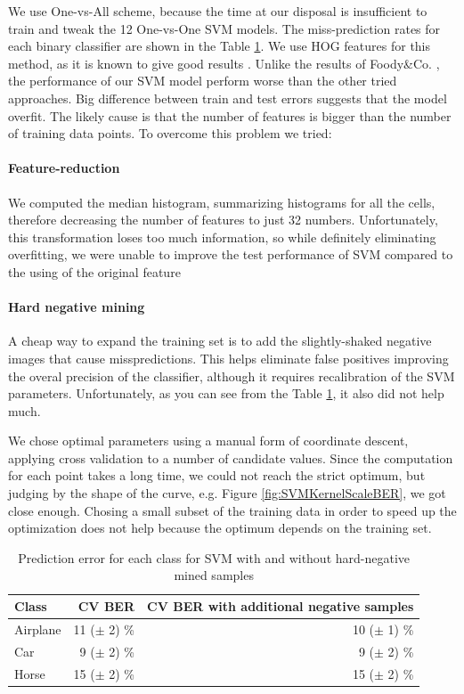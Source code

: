 \documentclass{article} %
\begin{document}
We use One-vs-All scheme, because the time at our disposal is insufficient to train and tweak the 12 One-vs-One SVM models. The miss-prediction rates for each binary classifier are shown in the Table \ref{tbl:SVMerr}. We use HOG features for this method, as it is known to give good results \cite{zhang2010pedestrian}. Unlike the results of Foody\&Co. \cite{foody2004relative}, the performance of our SVM model perform worse than the other tried approaches. Big difference between train and test errors suggests that the model overfit. The likely cause is that the number of features is bigger than the number of training data points. To overcome this problem we tried:

\paragraph{Feature-reduction} We computed the median histogram, summarizing histograms for all the cells, therefore decreasing the number of features to just 32 numbers. Unfortunately, this transformation loses too much information, so while definitely eliminating overfitting, we were unable to improve the test performance of SVM compared to the using of the original feature

\paragraph{Hard negative mining} A cheap way to expand the training set is to add the slightly-shaked negative images that cause misspredictions. This helps eliminate false positives improving the overal precision of the classifier, although it requires recalibration of the SVM parameters. Unfortunately, as you can see from the Table \ref{tbl:SVMerr}, it also did not help much.

We chose optimal parameters using a manual form of coordinate descent, applying cross validation to a number of candidate values. Since the computation for each point takes a long time, we could not reach the strict optimum, but judging by the shape of the curve, e.g. Figure \ref{fig:SVMKernelScaleBER}, we got close enough. Chosing a small subset of the training data in order to speed up the optimization does not help because the optimum depends on the training set.

\begin{table}
  \centering
  \begin{tabular}{|l|r|r|}
    \hline
    Class & CV BER & CV BER with additional negative samples \\ \hline
    Airplane & 11 ($\pm$ 2) \% & 10 ($\pm$ 1) \% \\
    Car & 9 ($\pm$ 2) \% & 9 ($\pm$ 2) \% \\
    Horse & 15 ($\pm$ 2) \% & 15 ($\pm$ 2) \% \\
    \hline
  \end{tabular}
  \caption{Prediction error for each class for SVM with and without hard-negative mined samples}
  \label{tbl:SVMerr}
\end{table}
\end{document}
